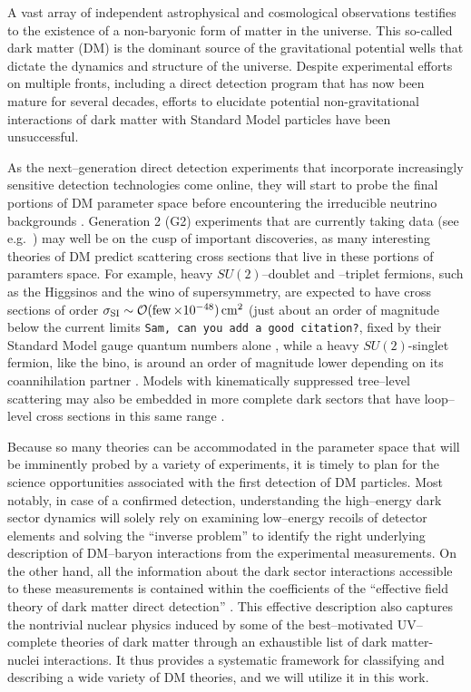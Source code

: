 \documentclass[11pt]{article}
\newcommand{\tenx}[1]{\times 10^{#1}}
\newcommand{\sjwColor}{red}
\newcommand{\sjwtt}[1]{{\color{\sjwColor}\tt #1}}
\begin{document}
A vast array of independent astrophysical and cosmological observations testifies to the existence of a non-baryonic form of matter in the universe. This so-called dark matter (DM) is the dominant source of the gravitational potential wells that dictate the dynamics and structure of the universe. Despite experimental efforts on multiple fronts, including a direct detection program that has now been mature for several decades, efforts to elucidate potential non-gravitational interactions of dark matter with Standard Model particles have been unsuccessful. 

As the next--generation direct detection experiments that incorporate increasingly sensitive detection technologies come online, they will start to probe the final portions of DM parameter space before encountering the irreducible neutrino backgrounds \cite{Bauer:2013ihz,Aprile:2015uzo,Agnese:2016cpb,Malling:2011va,Newstead:2013pea,Cushman:2013zza,Billard:2013qya,Ruppin:2014bra,Davis:2014ama,Dent:2016iht}. Generation 2 (G2) experiments that are currently taking data (see e.g.~\cite{Aprile:2015uzo}) may well be on the cusp of important discoveries, as many interesting theories of DM predict scattering cross sections that live in these portions of paramters space. For example, heavy $SU(2)$--doublet and --triplet fermions, such as the Higgsinos and the wino of supersymmetry, are expected to have cross sections of order $\sigma_{\rm SI} \sim \cO(\few\tenx{-48})\cm^2$ (just about an order of magnitude below the current limits \cite{}\sjwtt{Sam, can you add a good citation?}, fixed by their Standard Model gauge quantum numbers alone \cite{Hill:2011be,Hill:2013hoa,Hill:2014yxa}, while a heavy $SU(2)$-singlet fermion, like the bino, is around an order of magnitude lower depending on its coannihilation partner \cite{Berlin:2015njh}. Models with kinematically suppressed tree--level scattering may also be embedded in more complete dark sectors that have loop--level cross sections in this same range \cite{Ipek:2014gua,McDermott:2014rqa,Appelquist:2015yfa,Appelquist:2015zfa}.

Because so many theories can be accommodated in the parameter space that will be imminently probed by a variety of experiments, it is timely to plan for the science opportunities associated with the first detection of DM particles. Most notably, in case of a confirmed detection, understanding the high--energy dark sector dynamics will solely rely on examining low--energy recoils of detector elements and solving the ``inverse problem'' to identify the right underlying description of DM--baryon interactions from the experimental measurements. On the other hand, all the information about the dark sector interactions accessible to these measurements is contained within the coefficients of the ``effective field theory of dark matter direct detection'' \cite{Fitzpatrick:2012ix, Anand:2013yka}. This effective description also captures the nontrivial nuclear physics induced by some of the best--motivated UV--complete theories of dark matter \cite{Gresham:2014vja, Gluscevic:2015sqa} through an exhaustible list of dark matter-nuclei interactions. It thus provides a systematic framework for classifying and describing a wide variety of DM theories, and we will utilize it in this work. 
 
\end{document}
